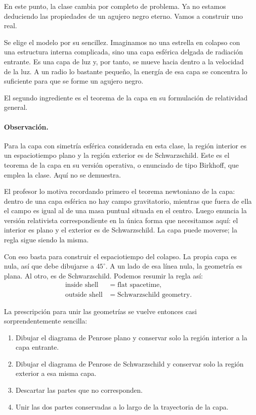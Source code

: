 En este punto, la clase cambia por completo de problema. Ya no estamos deduciendo las propiedades de un agujero negro eterno. Vamos a construir uno real.

Se elige el modelo por su sencillez. Imaginamos no una estrella en colapso con una estructura interna complicada, sino una capa esférica delgada de radiación entrante. Es una capa de luz y, por tanto, se mueve hacia dentro a la velocidad de la luz. A un radio lo bastante pequeño, la energía de esa capa se concentra lo suficiente para que se forme un agujero negro.

El segundo ingrediente es el teorema de la capa en su formulación de relatividad general.

\paragraph{Observación.} Para la capa con simetría esférica considerada en esta clase, la región interior es un espaciotiempo plano y la región exterior es de Schwarzschild. Este es el teorema de la capa en su versión operativa, o enunciado de tipo Birkhoff, que emplea la clase. Aquí no se demuestra.

El profesor lo motiva recordando primero el teorema newtoniano de la capa: dentro de una capa esférica no hay campo gravitatorio, mientras que fuera de ella el campo es igual al de una masa puntual situada en el centro. Luego enuncia la versión relativista correspondiente en la única forma que necesitamos aquí: el interior es plano y el exterior es de Schwarzschild. La capa puede moverse; la regla sigue siendo la misma.

Con eso basta para construir el espaciotiempo del colapso. La propia capa es nula, así que debe dibujarse a \(45^\circ\). A un lado de esa línea nula, la geometría es plana. Al otro, es de Schwarzschild. Podemos resumir la regla así:
\begin{equation}
\begin{aligned}
\text{inside shell} &= \text{flat spacetime},\\
\text{outside shell} &= \text{Schwarzschild geometry}.
\end{aligned}
\end{equation}

La prescripción para unir las geometrías se vuelve entonces casi sorprendentemente sencilla:

\begin{enumerate}
\item Dibujar el diagrama de Penrose plano y conservar solo la región interior a la capa entrante.
\item Dibujar el diagrama de Penrose de Schwarzschild y conservar solo la región exterior a esa misma capa.
\item Descartar las partes que no corresponden.
\item Unir las dos partes conservadas a lo largo de la trayectoria de la capa.
\end{enumerate}

